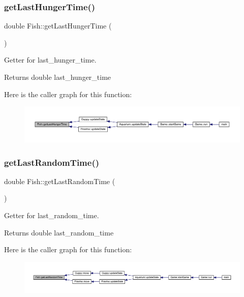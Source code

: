 \subsubsection{\texorpdfstring{get\+Last\+Hunger\+Time()}{getLastHungerTime()}}
{\footnotesize\ttfamily double Fish\+::get\+Last\+Hunger\+Time (\begin{DoxyParamCaption}{ }\end{DoxyParamCaption})}



Getter for last\+\_\+hunger\+\_\+time. 

\begin{DoxyReturn}{Returns}
double last\+\_\+hunger\+\_\+time 
\end{DoxyReturn}
Here is the caller graph for this function\+:\nopagebreak
\begin{figure}[H]
\begin{center}
\leavevmode
\includegraphics[width=350pt]{class_fish_ab097bcfc0f0402bc1c9e048bf2351290_icgraph}
\end{center}
\end{figure}
\mbox{\label{class_fish_a4edfa0e606e5db4a648fdd5d016e1543}} 
\subsubsection{\texorpdfstring{get\+Last\+Random\+Time()}{getLastRandomTime()}}
{\footnotesize\ttfamily double Fish\+::get\+Last\+Random\+Time (\begin{DoxyParamCaption}{ }\end{DoxyParamCaption})}



Getter for last\+\_\+random\+\_\+time. 

\begin{DoxyReturn}{Returns}
double last\+\_\+random\+\_\+time 
\end{DoxyReturn}
Here is the caller graph for this function\+:\nopagebreak
\begin{figure}[H]
\begin{center}
\leavevmode
\includegraphics[width=350pt]{class_fish_a4edfa0e606e5db4a648fdd5d016e1543_icgraph}
\end{center}
\end{figure}
\mbox{\label{class_fish_a3f9ad26c3d1dfbc3d1334065691d55da}} 
